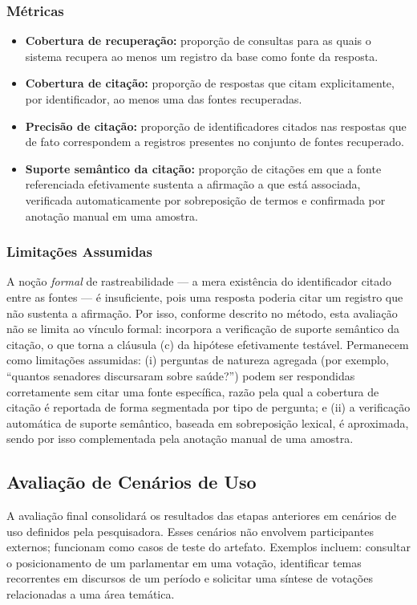 \subsubsection{Métricas}
\begin{itemize}
    \item \textbf{Cobertura de recuperação:} proporção de consultas para as quais o sistema recupera ao menos um registro da base como fonte da resposta.
    \item \textbf{Cobertura de citação:} proporção de respostas que citam explicitamente, por identificador, ao menos uma das fontes recuperadas.
    \item \textbf{Precisão de citação:} proporção de identificadores citados nas respostas que de fato correspondem a registros presentes no conjunto de fontes recuperado.
    \item \textbf{Suporte semântico da citação:} proporção de citações em que a fonte referenciada efetivamente sustenta a afirmação a que está associada, verificada automaticamente por sobreposição de termos e confirmada por anotação manual em uma amostra.
\end{itemize}

\subsubsection{Limitações Assumidas}
A noção \textit{formal} de rastreabilidade --- a mera existência do identificador citado entre as fontes --- é insuficiente, pois uma resposta poderia citar um registro que não sustenta a afirmação. Por isso, conforme descrito no método, esta avaliação não se limita ao vínculo formal: incorpora a verificação de suporte semântico da citação, o que torna a cláusula (c) da hipótese efetivamente testável. Permanecem como limitações assumidas: (i) perguntas de natureza agregada (por exemplo, ``quantos senadores discursaram sobre saúde?'') podem ser respondidas corretamente sem citar uma fonte específica, razão pela qual a cobertura de citação é reportada de forma segmentada por tipo de pergunta; e (ii) a verificação automática de suporte semântico, baseada em sobreposição lexical, é aproximada, sendo por isso complementada pela anotação manual de uma amostra.

\subsection{Avaliação de Cenários de Uso}

A avaliação final consolidará os resultados das etapas anteriores em cenários de uso definidos pela pesquisadora. Esses cenários não envolvem participantes externos; funcionam como casos de teste do artefato. Exemplos incluem: consultar o posicionamento de um parlamentar em uma votação, identificar temas recorrentes em discursos de um período e solicitar uma síntese de votações relacionadas a uma área temática.
